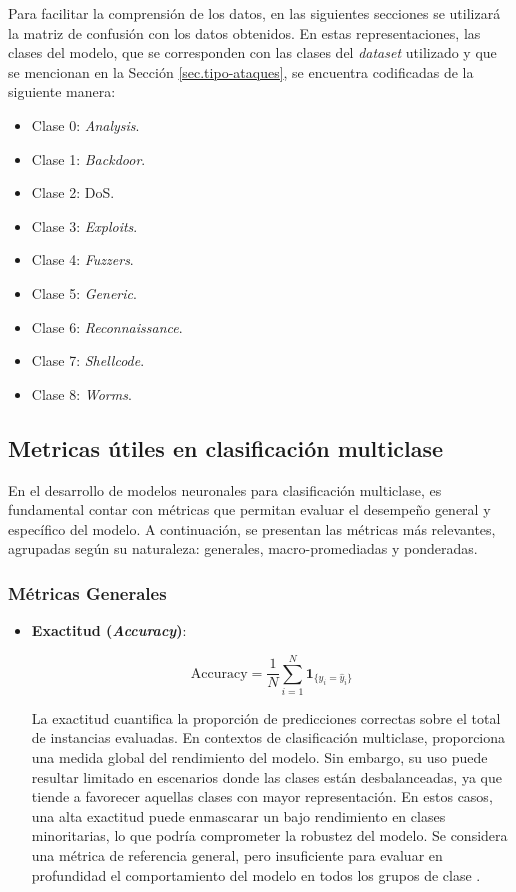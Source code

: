 Para facilitar la comprensión de los datos, en las siguientes secciones se utilizará la matriz de confusión con los datos obtenidos. En estas representaciones, las clases del modelo, que se corresponden con las clases del \textit{dataset} utilizado y que se mencionan en la Sección \ref{sec.tipo-ataques}, se encuentra codificadas de la siguiente manera:

\begin{itemize}
	\item Clase 0: \textit{Analysis}.
	\item Clase 1: \textit{Backdoor}.
	\item Clase 2: DoS.
	\item Clase 3: \textit{Exploits}. 
	\item Clase 4: \textit{Fuzzers}.
	\item Clase 5: \textit{Generic}.
	\item Clase 6: \textit{Reconnaissance}.
	\item Clase 7: \textit{Shellcode}.
	\item Clase 8: \textit{Worms}.
\end{itemize}


\subsection{Metricas útiles en clasificación multiclase} \label{sec:metricas-mul}

En el desarrollo de modelos neuronales para clasificación multiclase, es fundamental contar con métricas que permitan evaluar el desempeño general y específico del modelo. A continuación, se presentan las métricas más relevantes, agrupadas según su naturaleza: generales, macro-promediadas y ponderadas.
\subsubsection*{Métricas Generales}

\begin{itemize}

\item \textbf{Exactitud (\textit{Accuracy})}:

\begin{equation}
\text{Accuracy} = \frac{1}{N} \sum_{i=1}^{N} \mathbf{1}_{\{y_i = \hat{y}_i\}}
\end{equation}

La exactitud cuantifica la proporción de predicciones correctas sobre el total de instancias evaluadas. En contextos de clasificación multiclase, proporciona una medida global del rendimiento del modelo. Sin embargo, su uso puede resultar limitado en escenarios donde las clases están desbalanceadas, ya que tiende a favorecer aquellas clases con mayor representación. En estos casos, una alta exactitud puede enmascarar un bajo rendimiento en clases minoritarias, lo que podría comprometer la robustez del modelo. Se considera una métrica de referencia general, pero insuficiente para evaluar en profundidad el comportamiento del modelo en todos los grupos de clase \cite{Sokolova2006}.

\end{itemize}

